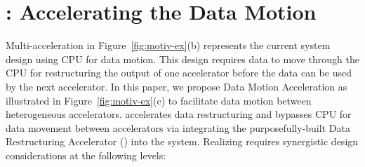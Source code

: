 \section{\dmx: Accelerating the Data Motion}
\label{sec:dmx}

Multi-acceleration in Figure~\ref{fig:motiv-ex}(b) represents the current system design using CPU for data motion. This design requires data to move through the CPU for restructuring the output of one accelerator before the data can be used by the next accelerator. 
%
In this paper, we propose Data Motion Acceleration as illustrated in Figure~\ref{fig:motiv-ex}(c) to facilitate data motion between heterogeneous accelerators. %
%
\dmx accelerates data restructuring and bypasses CPU for data movement between accelerators via integrating the purposefully-built Data Restructuring Accelerator (\drx) into the system.
%
%
%
Realizing \dmx requires synergistic design considerations at the following levels: %
%
